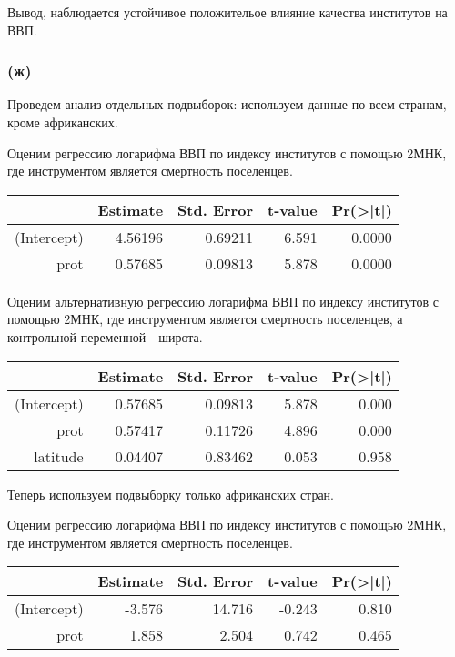\documentclass[a4paper,12pt]{article} %
\begin{document}
Вывод, наблюдается устойчивое  положительое  влияние качества институтов на ВВП.


\subsubsection*{(ж)}

Проведем анализ отдельных подвыборок:   используем  данные по всем странам, кроме
африканских.

Оценим регрессию логарифма ВВП по индексу институтов с помощью 2МНК, где инструментом является смертность  поселенцев.

\begin{table}[h!]
	\centering
	\begin{tabular}{rrrrr}
		\hline
		& Estimate & Std. Error & t-value & Pr(>|t|) \\ 
		\hline
		(Intercept) & 4.56196  &  0.69211 &  6.591 & 0.0000  \\ 
		prot & 0.57685 &   0.09813  & 5.878 & 0.0000 
		\\ 
		\hline
	\end{tabular}
\end{table}	



Оценим альтернативную регрессию логарифма ВВП по индексу институтов с помощью 2МНК, где инструментом является смертность  поселенцев, а контрольной переменной - широта.


\begin{table}[h!]
	\centering
	\begin{tabular}{rrrrr}
		\hline
		& Estimate & Std. Error & t-value & Pr(>|t|) \\ 
		\hline
		(Intercept) &  0.57685  &  0.09813 &  5.878 & 0.000    \\ 
		prot & 0.57417  &  0.11726 &  4.896 & 0.000 \\ 
		latitude &   0.04407  &  0.83462 &  0.053  &  0.958   
		\\ 
		\hline
	\end{tabular}
\end{table}	




Теперь используем подвыборку только африканских стран. 

Оценим регрессию логарифма ВВП по индексу институтов с помощью 2МНК, где инструментом является смертность  поселенцев.

\begin{table}[h!]
	\centering
	\begin{tabular}{rrrrr}
		\hline
		& Estimate & Std. Error & t-value & Pr(>|t|) \\ 
		\hline
		(Intercept) & -3.576  &  14.716 & -0.243  &  0.810  \\ 
		prot & 1.858   &   2.504 &  0.742  &  0.465 
		\\ 
		\hline
	\end{tabular}
\end{table}	
\end{document}
